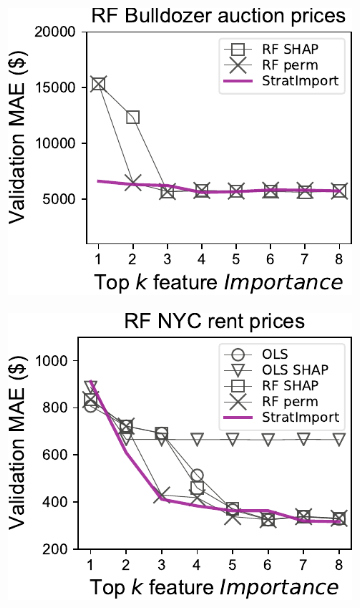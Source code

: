\documentclass[11pt]{article}
\begin{document}
\begin{figure}
\begin{subfigure}{.245\textwidth}
\includegraphics[scale=0.45]{images/bulldozer-topk-RF-Importance.pdf}
\end{subfigure}%
\hfill
\begin{subfigure}{.245\textwidth}
    \centering
\includegraphics[scale=0.45]{images/rent-topk-RF-Importance.pdf}
\end{subfigure}


\end{figure}
\end{document}
